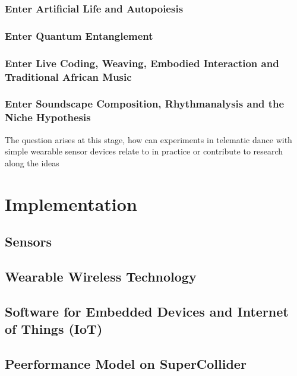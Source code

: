 \documentclass[11pt]{article}
\begin{document}
\subsubsection{Enter Artificial Life and Autopoiesis}
\label{sec:org9ba7f98}

\subsubsection{Enter Quantum Entanglement}
\label{sec:org30fd9ce}

\subsubsection{Enter Live Coding, Weaving, Embodied Interaction and Traditional African Music}
\label{sec:orgfa89587}

\subsubsection{Enter Soundscape Composition, Rhythmanalysis and the Niche Hypothesis}
\label{sec:org80a0972}

The question arises at this stage, how can experiments in telematic dance with simple wearable sensor devices relate to in practice or contribute to research along the ideas 

\section{Implementation}
\label{sec:orga62cbe2}

\subsection{Sensors}
\label{sec:orgb51caa0}

\subsection{Wearable Wireless Technology}
\label{sec:org4cb8101}

\subsection{Software for Embedded Devices and Internet of Things (IoT)}
\label{sec:orgc6d6bb9}

\subsection{Peerformance Model on SuperCollider}
\label{sec:orgb797068}
\end{document}

